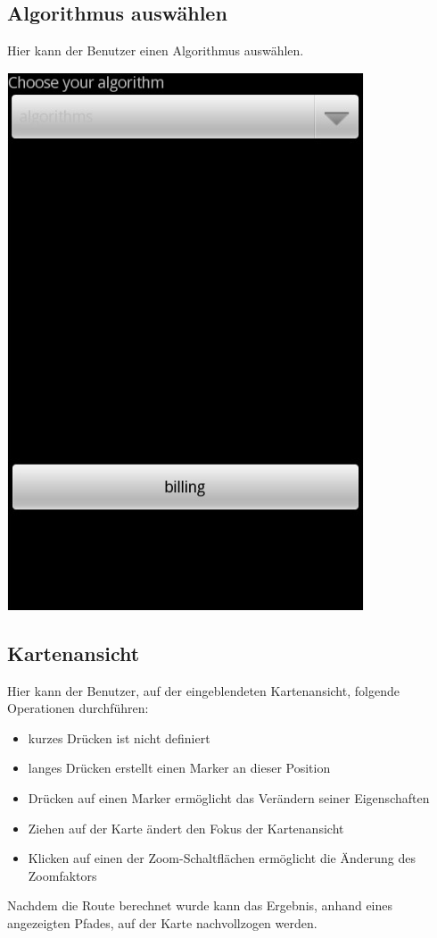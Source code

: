 \documentclass[a4paper,10pt,titlepage]{article}
\begin{document}
\subsection{Algorithmus auswählen}
Hier kann der Benutzer einen Algorithmus auswählen.
\begin {center}
\includegraphics[scale=0.47]{media/android/algorithms.jpg}
\end {center}

\newpage
\subsection{Kartenansicht}
Hier kann der Benutzer, auf der eingeblendeten Kartenansicht, folgende Operationen durchführen:
\begin {itemize}
\item kurzes Drücken ist nicht definiert
\item langes Drücken erstellt einen Marker an dieser Position
\item Drücken auf einen Marker ermöglicht das Verändern seiner Eigenschaften
\item Ziehen auf der Karte ändert den Fokus der Kartenansicht
\item Klicken auf einen der Zoom-Schaltflächen ermöglicht die Änderung des Zoomfaktors
\end {itemize}
Nachdem die Route berechnet wurde kann das Ergebnis, anhand eines angezeigten Pfades, auf der Karte nachvollzogen werden.
\end{document}
